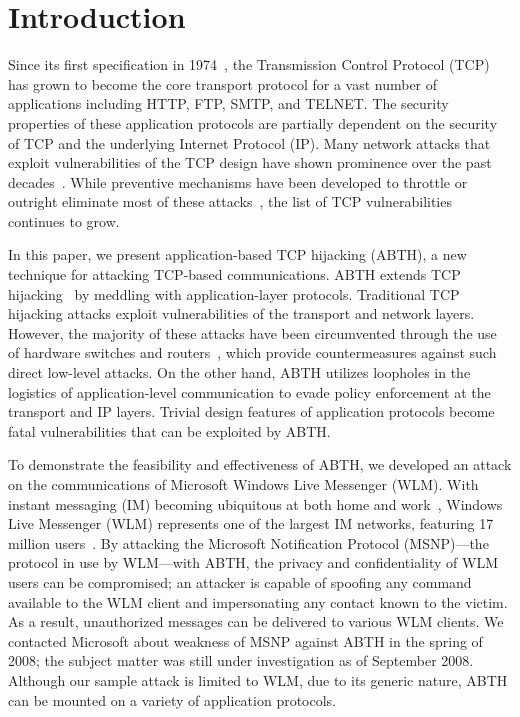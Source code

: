 \documentclass{sig-alternate}
\begin{document}


\section{Introduction}

Since its first specification in 1974~\cite{rfc:tcp}, the Transmission Control Protocol (TCP) has grown to become the core transport protocol for a vast number of applications including HTTP, FTP, SMTP, and TELNET.
The security properties of these application protocols are partially dependent on the security of TCP and the underlying Internet Protocol (IP).
Many network attacks that exploit vulnerabilities of the TCP design have shown prominence over the past decades~\cite{harris:tcpattacks}.
While preventive mechanisms have been developed to throttle or outright eliminate most of these attacks~\cite{dubrawsky:layer2}, the list of TCP vulnerabilities continues to grow.

In this paper, we present application-based TCP hijacking (ABTH), a new technique for attacking TCP-based communications.
ABTH extends TCP hijacking~\cite{stamp:infosec} by meddling with application-layer protocols.
Traditional TCP hijacking attacks exploit vulnerabilities of the transport and network layers.
However, the majority of these attacks have been circumvented through the use of hardware switches and routers~\cite{dubrawsky:layer2}, which provide countermeasures against such direct low-level attacks.
On the other hand, ABTH utilizes loopholes in the logistics of application-level communication to evade policy enforcement at the transport and IP layers.
Trivial design features of application protocols become fatal vulnerabilities that can be exploited by ABTH.

\begin{sloppypar}
To demonstrate the feasibility and effectiveness of ABTH, we developed an attack on the communications of Microsoft Windows Live Messenger (WLM).
With instant messaging (IM) becoming ubiquitous at both home and work~\cite{aol:survey}, Windows Live Messenger (WLM) represents one of the largest IM networks, featuring 17 million users~\cite{templeton:spoof}.
By attacking the Microsoft Notification Protocol (MSNP)---the protocol in use by WLM---with ABTH, the privacy and confidentiality of WLM users can be compromised; an attacker is capable of spoofing any command available to the WLM client and impersonating any contact known to the victim.
As a result, unauthorized messages can be delivered to various WLM clients.
We contacted Microsoft about weakness of MSNP against ABTH in the spring of 2008; the subject matter was still under investigation as of September 2008.
Although our sample attack is limited to WLM, due to its generic nature, ABTH can be mounted on a variety of application protocols.
\end{sloppypar}
\end{document}
